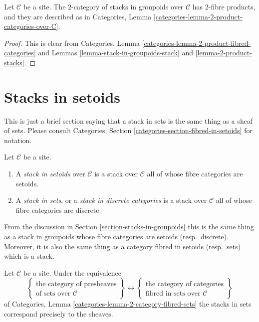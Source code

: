 \begin{lemma}
\label{lemma-2-product-stacks-in-groupoids}
Let $\mathcal{C}$ be a site.
The $2$-category of stacks in groupoids over $\mathcal{C}$
has 2-fibre products, and they are described as in
Categories, Lemma \ref{categories-lemma-2-product-categories-over-C}.
\end{lemma}

\begin{proof}
This is clear from
Categories, Lemma \ref{categories-lemma-2-product-fibred-categories}
and Lemmas \ref{lemma-stack-in-groupoids-stack}
and \ref{lemma-2-product-stacks}.
\end{proof}








\section{Stacks in setoids}
\label{section-stacks-in-setoids}

\noindent
This is just a brief section saying that a stack in sets
is the same thing as a sheaf of sets. Please consult
Categories, Section \ref{categories-section-fibred-in-setoids}
for notation.

\begin{definition}
\label{definition-stack-in-sets}
Let $\mathcal{C}$ be a site.
\begin{enumerate}
\item A {\it stack in setoids} over $\mathcal{C}$
is a stack over $\mathcal{C}$ all of whose fibre categories are
setoids.
\item A {\it stack in sets}, or a {\it stack in discrete categories}
is a stack over $\mathcal{C}$ all of whose fibre categories are discrete.
\end{enumerate}
\end{definition}

\noindent
From the discussion in
Section \ref{section-stacks-in-groupoids}
this is the same thing as a stack in groupoids whose fibre categories
are setoids (resp.\ discrete). Moreover, it is also the same thing
as a category fibred in setoids (resp.\ sets) which is a stack.

\begin{lemma}
\label{lemma-when-stack-in-sets}
Let $\mathcal{C}$ be a site. Under the equivalence
$$
\left\{
\begin{matrix}
\text{the category of presheaves}\\
\text{of sets over }\mathcal{C}
\end{matrix}
\right\}
\leftrightarrow
\left\{
\begin{matrix}
\text{the category of categories}\\
\text{fibred in sets over }\mathcal{C}
\end{matrix}
\right\}
$$
of
Categories, Lemma \ref{categories-lemma-2-category-fibred-sets}
the stacks in sets correspond precisely to the sheaves.
\end{lemma}

